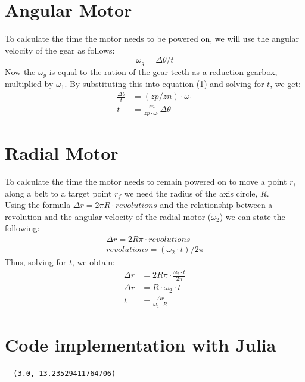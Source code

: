 \documentclass{article}
\begin{document}
\section{Angular Motor}
To calculate the time the motor needs to be powered on, we will use the angular velocity of the gear as follows:
\begin{equation}
  \omega_g = \Delta\theta/t
\end{equation}
Now the $\omega_g$ is equal to the ration of the gear teeth as a reduction gearbox, multiplied by $\omega_1$. By substituting this into equation (1) and solving for $t$, we get:
\begin{equation}
  \begin{split}
    \frac{\Delta\theta}{t} &= (zp/zn) \cdot \omega_1\\
     t &= \frac{zn}{zp \cdot \omega_1}\Delta\theta 
  \end{split}
\end{equation}
\section{Radial Motor}
To calculate the time the motor needs to remain powered on to move a point $r_i$ along a belt to a target point $r_f$ we need the radius of the axis circle, $R$. \\
Using the formula $\Delta r = 2\pi R \cdot \textit{revolutions}$ and the relationship between a revolution and the angular velocity of the radial motor ($\omega_2$) we can state the following:
\begin{equation}
  \begin{split}
    \Delta r = 2R\pi \cdot \textit{revolutions} \\
    \textit{revolutions} = (\omega_2 \cdot t)/2\pi
  \end{split}
\end{equation}
Thus, solving for $t$, we obtain:
\begin{equation}
  \begin{split}
    \Delta r &= 2R\pi \cdot \frac{\omega_2 \cdot t}{2\pi} \\
    \Delta r &= R \cdot \omega_2 \cdot t \\
    t &= \frac{\Delta r}{\omega_2 \cdot R}
  \end{split}
\end{equation}
\section{Code implementation with Julia}

\begin{lstlisting}
  (3.0, 13.23529411764706)
\end{lstlisting}
\end{document}
